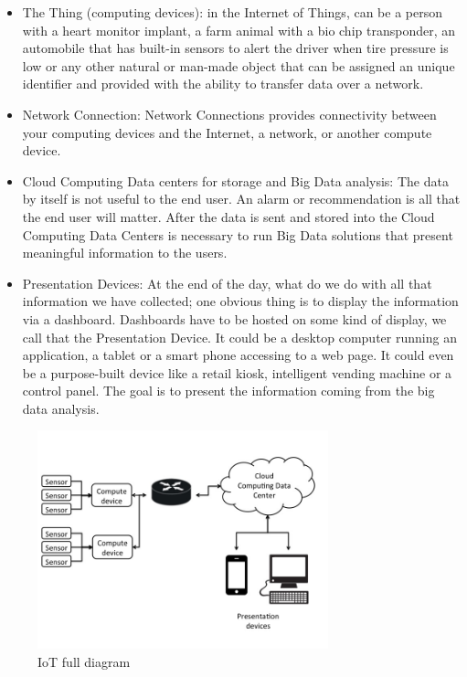\begin{itemize} 

\item The Thing (computing devices):  in the Internet of Things, can be a
person with a heart monitor implant, a farm animal with a bio chip transponder,
an automobile that has built-in sensors to alert the driver when tire pressure
is low or any other natural or man-made object that can be assigned
an unique identifier and provided with the ability to transfer data over a network.

\item Network Connection: Network Connections provides connectivity between
your computing devices  and the Internet, a network, or another compute device.

\item Cloud Computing Data centers for storage and Big Data analysis: The data
by itself is not useful to the end user. An alarm or recommendation is all that
the end user will matter. After the data is sent and stored into the Cloud
Computing Data Centers is necessary to run Big Data solutions that present
meaningful information to the users.

\item Presentation Devices: At the end of the day, what do we do with all that
information we have collected; one obvious thing is to display the information
via a dashboard. Dashboards have to be hosted on some kind of display, we call
that the Presentation Device.  It could be a desktop computer running an
application, a tablet or a smart phone accessing to a web page. It could even
be a purpose-built device like a retail kiosk, intelligent vending machine or a
control panel. The goal is to present the information coming from the big data
analysis.

\end{itemize}

\begin{figure}[H]
\centering
\includegraphics[width=0.75\textwidth]{images/IoT_diagram.jpg}
\caption{IoT full diagram }
\label{fig:1.1}
\end{figure}

